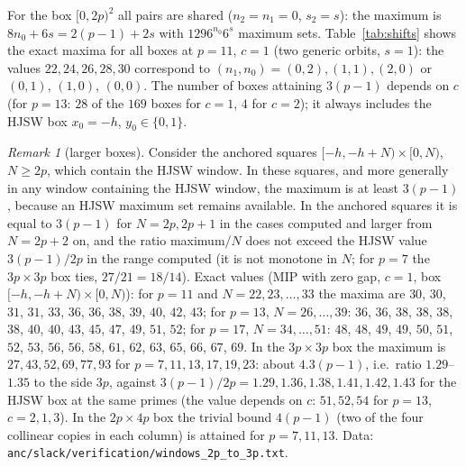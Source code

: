 \documentclass[11pt]{article}
\theoremstyle{remark}
\newtheorem{remark}[theorem]{Remark}
\begin{document}
For the box $[0,2p)^2$ all pairs are shared ($n_2=n_1=0$, $s_2=s$): the maximum is $8n_0+6s=2(p-1)+2s$ with $1296^{n_0}6^{s}$
maximum sets.  Table~\ref{tab:shifts} shows the exact maxima for all boxes at $p=11$, $c=1$ (two generic orbits, $s=1$): the
values $22,24,26,28,30$ correspond to $(n_1,n_0)=(0,2),(1,1),(2,0)$ or $(0,1)$, $(1,0)$, $(0,0)$.  The number of boxes attaining
$3(p-1)$ depends on $c$ (for $p=13$: $28$ of the $169$ boxes for $c=1$, $4$ for $c=2$); it always includes the HJSW box
$x_0=-h$, $y_0\in\{0,1\}$.

\begin{remark}[larger boxes]\label{rem:larger}
Consider the anchored squares $[-h,-h+N)\times[0,N)$, $N\ge2p$, which contain the HJSW window.
In these squares, and more generally in any window containing the HJSW window, the maximum is at least $3(p-1)$,
because an HJSW maximum set remains available.  In the anchored squares it is equal to $3(p-1)$ for
$N=2p,2p+1$ in the cases computed and larger from $N=2p+2$ on, and the ratio maximum$/N$ does not exceed the HJSW value
$3(p-1)/2p$ in the range computed (it is not monotone in $N$; for $p=7$ the $3p\times3p$ box ties, $27/21=18/14$).  Exact values (MIP with zero gap, $c=1$, box
$[-h,-h+N)\times[0,N)$): for $p=11$ and $N=22,23,\dots,33$ the maxima are
$30$, $30$, $31$, $31$, $33$, $36$, $36$, $38$, $39$, $40$, $42$, $43$; for $p=13$, $N=26,\dots,39$: $36$, $36$, $38$, $38$, $38$,
$38$, $40$, $40$, $43$, $45$, $47$, $49$, $51$, $52$; for $p=17$,
$N=34,\dots,51$: $48$, $48$, $49$, $49$, $50$, $51$, $52$, $53$, $56$, $56$, $58$, $61$, $62$, $63$, $65$, $66$, $67$, $69$.  In the $3p\times3p$ box the maximum is
$27,43,52,69,77,93$ for $p=7,11,13,17,19,23$: about $4.3(p-1)$, i.e.\ ratio $1.29$--$1.35$ to the side $3p$, against
$3(p-1)/2p=1.29,1.36,1.38,1.41,1.42,1.43$ for the HJSW box at the same primes (the value depends on $c$: $51,52,54$ for
$p=13$, $c=2,1,3$).  In the $2p\times4p$ box the trivial bound $4(p-1)$ (two of the four
collinear copies in each column) is attained for $p=7,11,13$.  Data: \texttt{anc/slack/verification/windows\_2p\_to\_3p.txt}.
\end{remark}
\end{document}
